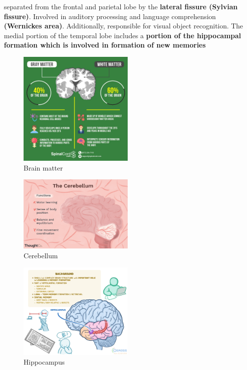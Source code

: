 \documentclass{article}
\begin{document}
\noindent separated from the frontal and parietal lobe by the \textbf{lateral fissure (Sylvian fissure)}. Involved in auditory processing and language comprehension \textbf{(Wernickes area)}. Additionally, responsible for visual object recognition. The medial portion of the temporal lobe includes a \textbf{portion of the hippocampal formation which is involved in formation of new memories}

\begin{figure}[h]
\centering
\includegraphics[width=0.5\textwidth]{assets/matter.png}
\caption{Brain matter}
\end{figure}

\begin{figure}[h]
\centering
\includegraphics[width=0.5\textwidth]{assets/cerebellum.png}
\caption{Cerebellum}
\end{figure}

\begin{figure}[h]
\centering
\includegraphics[width=0.5\textwidth]{assets/hippocampus.png}
\caption{Hippocampus}
\end{figure}
\end{document}
